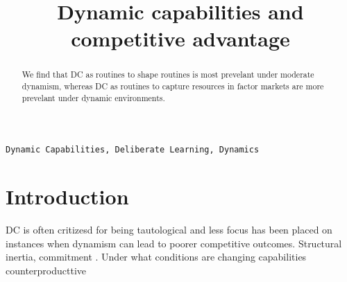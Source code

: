 \documentclass[review,fleqn]{elsarticle}\usepackage[]{graphicx}\usepackage[]{color}
\begin{document}
\begin{frontmatter}


\title{Dynamic capabilities and competitive advantage}





\begin{abstract}
 We find that DC as routines to shape routines is most prevelant under moderate dynamism,
whereas DC as routines to capture resources in factor markets are more prevelant under
dynamic environments.

\end{abstract}

\begin{keyword}
\texttt{Dynamic Capabilities, Deliberate Learning, Dynamics }
\end{keyword}

\end{frontmatter}



\doublespacing


\section{Introduction}

DC is often critizesd for being tautological and less focus has been placed on instances
when dynamism can lead to poorer competitive outcomes. 
Structural inertia, commitment \cite{schreyogg2007}. Under what conditions are changing
capabilities counterproducttive
\end{document}
